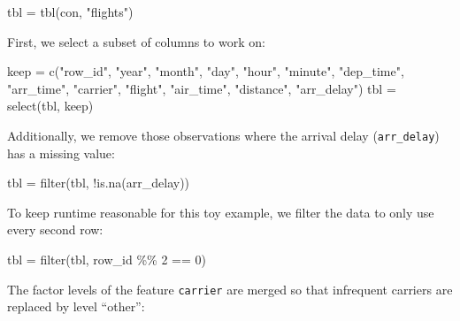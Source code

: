 \documentclass[
]{scrbook}
\newenvironment{Shaded}{\begin{snugshade}}{\end{snugshade}}
\newcommand{\DecValTok}[1]{\textcolor[rgb]{0.00,0.00,0.81}{#1}}
\newcommand{\FunctionTok}[1]{\textcolor[rgb]{0.00,0.00,0.00}{#1}}
\newcommand{\NormalTok}[1]{#1}
\newcommand{\OtherTok}[1]{\textcolor[rgb]{0.56,0.35,0.01}{#1}}
\newcommand{\SpecialCharTok}[1]{\textcolor[rgb]{0.00,0.00,0.00}{#1}}
\newcommand{\StringTok}[1]{\textcolor[rgb]{0.31,0.60,0.02}{#1}}
\renewenvironment{Shaded} {\begin{snugshade}\small} {\end{snugshade}}
\begin{document}
\begin{Shaded}
\begin{Highlighting}[]
\NormalTok{tbl }\OtherTok{=} \FunctionTok{tbl}\NormalTok{(con, }\StringTok{"flights"}\NormalTok{)}
\end{Highlighting}
\end{Shaded}

First, we select a subset of columns to work on:

\begin{Shaded}
\begin{Highlighting}[]
\NormalTok{keep }\OtherTok{=} \FunctionTok{c}\NormalTok{(}\StringTok{"row\_id"}\NormalTok{, }\StringTok{"year"}\NormalTok{, }\StringTok{"month"}\NormalTok{, }\StringTok{"day"}\NormalTok{, }\StringTok{"hour"}\NormalTok{, }\StringTok{"minute"}\NormalTok{, }\StringTok{"dep\_time"}\NormalTok{,}
  \StringTok{"arr\_time"}\NormalTok{, }\StringTok{"carrier"}\NormalTok{, }\StringTok{"flight"}\NormalTok{, }\StringTok{"air\_time"}\NormalTok{, }\StringTok{"distance"}\NormalTok{, }\StringTok{"arr\_delay"}\NormalTok{)}
\NormalTok{tbl }\OtherTok{=} \FunctionTok{select}\NormalTok{(tbl, keep)}
\end{Highlighting}
\end{Shaded}

Additionally, we remove those observations where the arrival delay (\texttt{arr\_delay}) has a missing value:

\begin{Shaded}
\begin{Highlighting}[]
\NormalTok{tbl }\OtherTok{=} \FunctionTok{filter}\NormalTok{(tbl, }\SpecialCharTok{!}\FunctionTok{is.na}\NormalTok{(arr\_delay))}
\end{Highlighting}
\end{Shaded}

To keep runtime reasonable for this toy example, we filter the data to only use every second row:

\begin{Shaded}
\begin{Highlighting}[]
\NormalTok{tbl }\OtherTok{=} \FunctionTok{filter}\NormalTok{(tbl, row\_id }\SpecialCharTok{\%\%} \DecValTok{2} \SpecialCharTok{==} \DecValTok{0}\NormalTok{)}
\end{Highlighting}
\end{Shaded}

The factor levels of the feature \texttt{carrier} are merged so that infrequent carriers are replaced by level ``other'':
\end{document}
